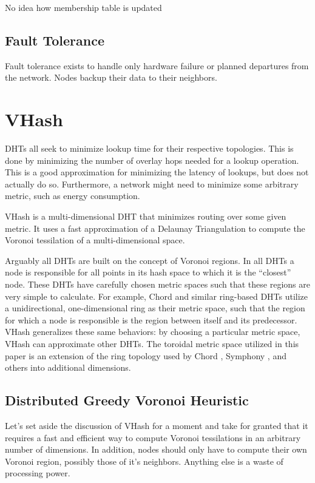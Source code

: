 \documentclass[10pt,letterpaper,twoside]{report}
\begin{document}
No idea how membership table is updated

\subsection*{Fault Tolerance}
Fault tolerance exists to handle only hardware failure or planned departures from the network.
Nodes backup their data to their neighbors.


\section{VHash}
DHTs all seek to minimize lookup time for their respective topologies.
This is done by minimizing the number of overlay hops needed for a lookup operation.
This is a good approximation for minimizing the latency of lookups, but does not actually do so.
Furthermore, a network might need to minimize some arbitrary metric, such as energy consumption.

VHash is a multi-dimensional DHT that minimizes routing over some given metric.
It uses a fast approximation of a Delaunay Triangulation to compute the Voronoi tessilation of a multi-dimensional space.



Arguably all DHTs are built on the concept of Voronoi regions.
In all DHTs a node is responsible for all points in its hash space to which it is the ``closest'' node.
These DHTs have carefully chosen metric spaces such that these regions are very simple to calculate.
For example, Chord and similar ring-based DHTs utilize a unidirectional, one-dimensional ring as their metric space, such that the region for which a node is responsible is the region between itself and its predecessor.
VHash generalizes these same behaviors: by choosing a particular metric space, VHash can approximate other DHTs.
The toroidal metric space utilized in this paper is an extension of the ring topology used by Chord \cite{chord}, Symphony \cite{symphony}, and others into additional dimensions. 




\subsection*{Distributed Greedy Voronoi Heuristic}
Let's set aside the discussion of VHash for a moment and take for granted that it requires a fast and efficient way to compute Voronoi tessilations in an arbitrary number of dimensions.
In addition, nodes should only have to compute their own Voronoi region, possibly those of it's neighbors. 
Anything else is a waste of processing power.
\end{document}
